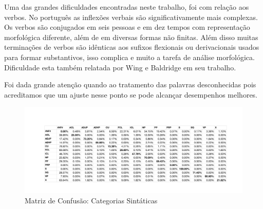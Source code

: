 Uma das grandes dificuldades encontradas neste trabalho, foi com relação aos verbos. No português as inflexões verbais são significativamente mais complexas. Os verbos são conjugados em seis pessoas e em dez tempos com representação morfológica diferente, além de em diversas formas não finitas. Além disso muitas terminações de verbos são idênticas aos sufixos flexionais ou derivacionais usados para formar substantivos, isso complica e muito a tarefa de análise morfológica. Dificuldade esta também relatada por Wing e Baldridge em seu trabalho.

Foi dada grande atenção quando ao tratamento das palavras desconhecidas pois acreditamos que um ajuste nesse ponto se pode alcançar desempenhos melhores.

\begin{figure}
  \begin{center}
	\includegraphics[scale=0.65]{score_confusion_cat.pdf}
	\caption{\label{confusion_matrix_cat} Matriz de Confusão: Categorias Sintáticas}		
  \end{center}
\end{figure}